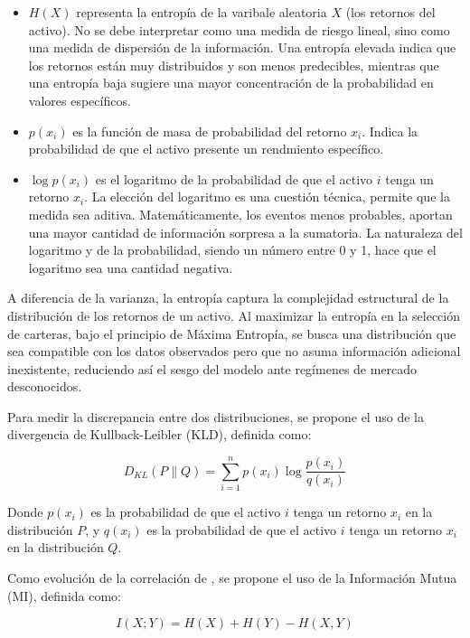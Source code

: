 \begin{itemize}
    \item $H(X)$ representa la entropía de la varibale aleatoria $X$ (los retornos del activo). No se debe interpretar como una medida de riesgo lineal, sino como una medida de dispersión de la información. Una entropía elevada indica que los retornos están muy distribuidos y son menos predecibles, mientras que una entropía baja sugiere una mayor concentración de la probabilidad en valores específicos.
    \item $p(x_i)$ es la función de masa de probabilidad del retorno $x_i$. Indica la probabilidad de que el activo presente un rendmiento específico.
    \item $\log p(x_i)$ es el logaritmo de la probabilidad de que el activo $i$ tenga un retorno $x_i$. La elección del logaritmo es una cuestión técnica, permite que la medida sea aditiva. Matemáticamente, los eventos menos probables, aportan una mayor cantidad de información sorpresa a la sumatoria. La naturaleza del logaritmo y de la probabilidad, siendo un número entre 0 y 1, hace que el logaritmo sea una cantidad negativa.
\end{itemize}

A diferencia de la varianza, la entropía captura la complejidad estructural de la distribución de los retornos de un activo. Al maximizar la entropía en la selección de carteras, bajo el principio de Máxima Entropía, se busca una distribución que sea compatible con los datos observados pero que no asuma información adicional inexistente, reduciendo así el sesgo del modelo ante regímenes de mercado desconocidos.

Para medir la discrepancia entre dos distribuciones, se propone el uso de la divergencia de Kullback-Leibler (KLD), definida como:

\begin{equation}
D_{KL}(P \parallel Q) = \sum_{i=1}^n p(x_i) \log \frac{p(x_i)}{q(x_i)}
\end{equation}

Donde $p(x_i)$ es la probabilidad de que el activo $i$ tenga un retorno $x_i$ en la distribución $P$, y $q(x_i)$ es la probabilidad de que el activo $i$ tenga un retorno $x_i$ en la distribución $Q$.

Como evolución de la correlación de \cite{markowitz1952}, se propone el uso de la Información Mutua (MI), definida como:

\begin{equation}
I(X;Y) = H(X) + H(Y) - H(X,Y)
\end{equation}

